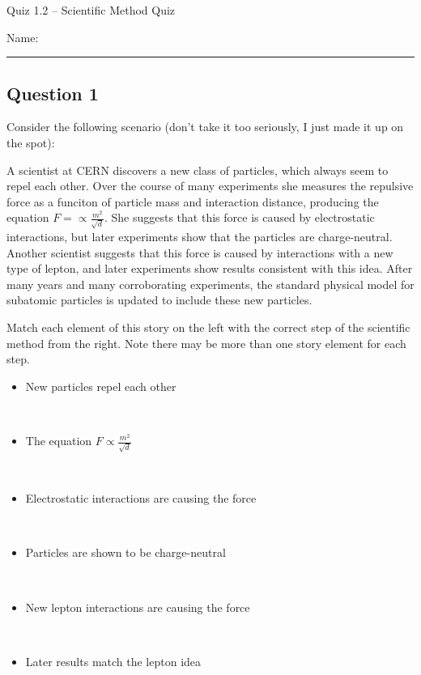 \documentclass[11pt, letterpaper]{memoir}
\begin{document}
\begin{center}
	{\large	Quiz 1.2 -- Scientific Method Quiz}
\end{center}
{\large Name: \rule[-1mm]{4in}{.1pt}
\subsection*{Question 1}
Consider the following scenario (don't take it too seriously, I just made it up on the spot):

A scientist at CERN discovers a new class of particles, which always seem to repel each other. Over the course of many experiments she measures the repulsive force as a funciton of particle mass and interaction distance, producing the equation $F=\propto\frac{m^2}{\sqrt{d}}$. She suggests that this force is caused by electrostatic interactions, but later experiments show that the particles are charge-neutral. Another scientist suggests that this force is caused by interactions with a new type of lepton, and later experiments show results consistent with this idea. After many years and many corroborating experiments, the standard physical model for subatomic particles is updated to include these new particles.

Match each element of this story on the left with the correct step of the scientific method from the right. Note there may be more than one story element for each step.

\noindent
\begin{minipage}{0.65\textwidth}
	\vspace{0.8em}
	\begin{itemize}
		\item New particles repel each other

		      ~

		\item The equation $F\propto\frac{m^2}{\sqrt{d}}$

		      ~

		\item Electrostatic interactions are causing the force

		      ~

		\item Particles are shown to be charge-neutral

		      ~

		\item New lepton interactions are causing the force

		      ~

		\item Later results match the lepton idea


\end{itemize}
\end{minipage}}
\end{document}
